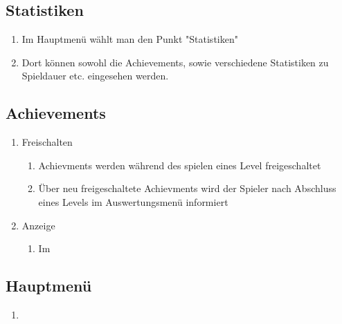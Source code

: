 \documentclass{scrartcl}
\begin{document}
\subsection{Statistiken}
	\begin{enumerate}
		\item Im Hauptmenü wählt man den Punkt "Statistiken"
		\item Dort können sowohl die Achievements, sowie verschiedene Statistiken zu Spieldauer etc. eingesehen werden.
	\end{enumerate}

\subsection{Achievements}
 \begin{enumerate}
 	\item Freischalten
 		\begin{enumerate}
 			\item Achievments werden während des spielen eines Level freigeschaltet
 			\item Über neu freigeschaltete Achievments wird der Spieler nach Abschluss eines Levels im Auswertungsmenü informiert
 		\end{enumerate}
 	\item Anzeige
 	 	\begin{enumerate}
 	 		\item Im
 		\end{enumerate}
 \end{enumerate}

\subsection{Hauptmenü}
	\begin{enumerate}
		\item 
	\end{enumerate}	
\end{document}

